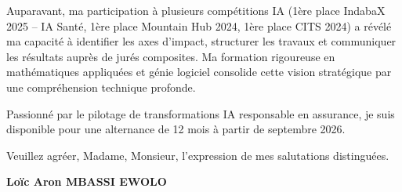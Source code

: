 \documentclass[a4paper,11pt]{article}
\begin{document}
\vspace{0.8em}

Auparavant, ma participation \`a plusieurs comp\'etitions IA (1ère place IndabaX 2025 -- IA Sant\'e, 1ère place Mountain Hub 2024, 1ère place CITS 2024) a r\'ev\'el\'e ma capacit\'e \`a identifier les axes d'impact, structurer les travaux et communiquer les r\'esultats aupr\`es de jur\'es composites. Ma formation rigoureuse en math\'ematiques appliqu\'ees et g\'enie logiciel consolide cette vision strat\'egique par une compr\'ehension technique profonde.

\vspace{0.8em}

Passionn\'e par le pilotage de transformations IA responsable en assurance, je suis disponible pour une alternance de 12 mois \`a partir de septembre 2026.

\vspace{1.5em}
\noindent Veuillez agr\'eer, Madame, Monsieur, l'expression de mes salutations distingu\'ees.

\vspace{2em}
\noindent \textbf{Lo\"ic Aron MBASSI EWOLO}
\end{document}
